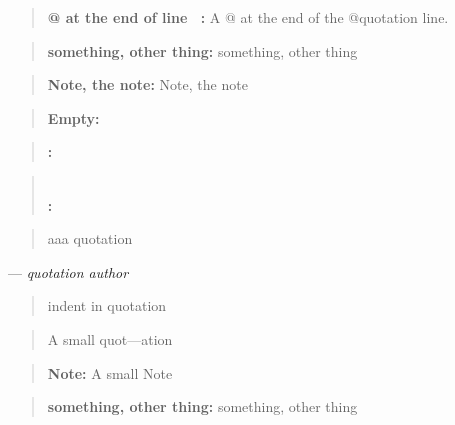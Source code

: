 \documentclass{book}
\begin{document}
\begin{quote}
\textbf{@ at the end of line \ {}:} A @ at the end of the @quotation line.
\end{quote}

\begin{quote}
\textbf{something, other thing:} something, other thing
\end{quote}

\begin{quote}
\textbf{Note, the note:} Note, the note
\end{quote}

\begin{quote}
\end{quote}

\begin{quote}
\textbf{Empty:} \end{quote}

\begin{quote}
\textbf{:} \end{quote}

\begin{quote}
\textbf{\leavevmode{}\\:} \end{quote}

\begin{quote}
aaa quotation
\end{quote}
\begin{center}
--- \emph{quotation author}
\end{center}

\begin{quote}
indent in quotation
\end{quote}

\begin{quote}
\begin{footnotesize}
A small quot---ation
\end{footnotesize}
\end{quote}

\begin{quote}
\begin{footnotesize}
\textbf{Note:} A small Note
\end{footnotesize}
\end{quote}

\begin{quote}
\begin{footnotesize}
\textbf{something, other thing:} something, other thing
\end{footnotesize}
\end{quote}
\end{document}
